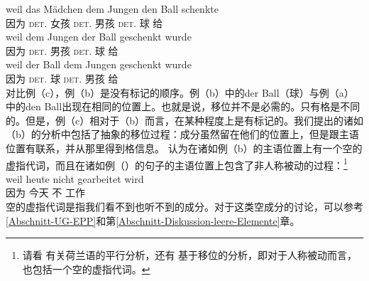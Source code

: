 \eal
\label{ex-passive-German-no-movement}
\ex 
\gll weil das Mädchen dem Jungen den Ball schenkte\\
     因为 \textsc{det}.\nom{} 女孩 \textsc{det}.\dat{} 男孩 \textsc{det}.\acc{} 球 给\\
\ex 
\gll weil dem Jungen der Ball geschenkt wurde\\
	 因为 \textsc{det}.\dat{} 男孩 \textsc{det}.\nom{} 球 给 \passivepst{}\\
\ex 
\gll weil der Ball dem Jungen geschenkt wurde\\
     因为 \textsc{det}.\nom{} 球 \textsc{det}.\dat{} 男孩 给 \passivepst{}\\
\zl
对比例（c），例（b）是没有标记的顺序。例（b）中的der Ball（球）与例（a）中的den Ball出现在相同的位置上。也就是说，移位并不是必需的。只有格是不同的。但是，例（c）相对于（b）而言，在某种程度上是有标记的。我们提出的诸如（b）的分析中包括了抽象的移位过程：成分虽然留在他们的位置上，但是跟主语位置有联系，并从那里得到格信息。 \citet[]{Grewendorf93}认为在诸如例（b）的主语位置上有一个空的虚指代词，而且在诸如例（）的句子的主语位置上包含了非人称被动的过程：\footnote{%
请看 有关荷兰语的平行分析，还有 基于移位的分析，即对于人称被动而言，也包括一个空的虚指代词。
}
\ea
\gll weil heute nicht gearbeitet wird\\
     因为 今天 不 工作 \passiveprs{}\\
\z
空的虚指代词是指我们看不到也听不到的成分。对于这类空成分的讨论，可以参考\ref{Abschnitt-UG-EPP}和第\ref{Abschnitt-Diskussion-leere-Elemente}章。

